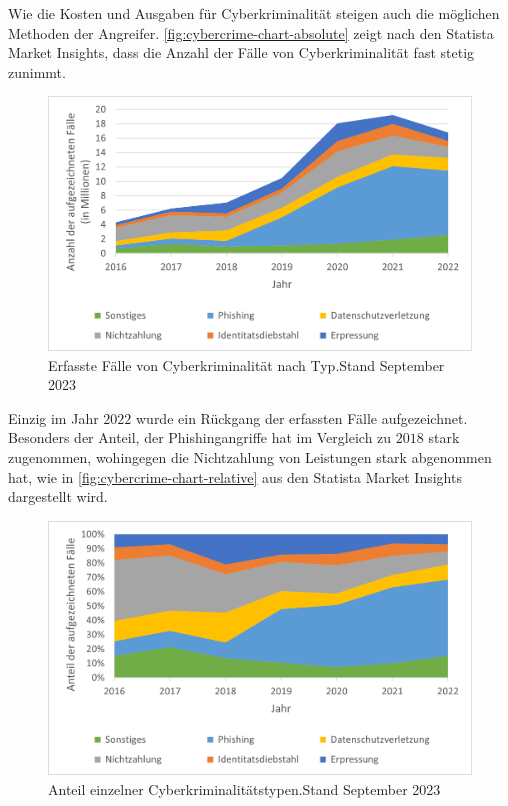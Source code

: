 Wie die Kosten und Ausgaben für Cyberkriminalität steigen auch die möglichen Methoden der Angreifer.
\autoref{fig:cybercrime-chart-absolute} zeigt nach den Statista Market Insights\autocite[\vglf][]{statista-cybersecurity-cybercrime}, dass die Anzahl der Fälle von Cyberkriminalität fast stetig zunimmt.

\begin{figure}[htpb]
    \centering
    \includegraphics[width = 0.75\linewidth, trim = {0.55cm 0.3cm 0.4cm 0.25cm}, clip]{src/abbildungen/Aufgezeichnete_Cyberkriminalitaet}
    \captionsetup{width=\linewidth, format=hang}
    \caption[Erfasste Fälle von Cyberkriminalität nach Typ]{Erfasste Fälle von Cyberkriminalität nach Typ.\newline Stand September 2023}
    \label{fig:cybercrime-chart-absolute}
\end{figure}

Einzig im Jahr $2022$ wurde ein Rückgang der erfassten Fälle aufgezeichnet.
Besonders der Anteil, der Phishingangriffe hat im Vergleich zu $2018$ stark zugenommen, wohingegen die Nichtzahlung von Leistungen stark abgenommen hat, wie in \autoref{fig:cybercrime-chart-relative} aus den Statista Market Insights\autocite[\vglf][]{statista-cybersecurity-cybercrime} dargestellt wird.

\begin{figure}[htpb]
    \centering
    \includegraphics[width = 0.75\linewidth, trim = {0.55cm 0.3cm 0.4cm 0.25cm}, clip]{src/abbildungen/Anteile_Cyberkriminalitaet}
    \captionsetup{width=\linewidth, format=hang}
    \caption[Anteil einzelner Cyberkriminalitätstypen]{Anteil einzelner Cyberkriminalitätstypen.\newline Stand September 2023}
    \label{fig:cybercrime-chart-relative}
\end{figure}

